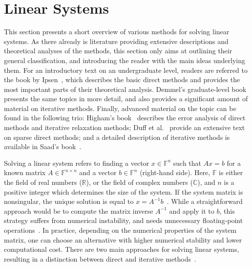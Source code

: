 \section{Linear Systems}
\label{introduction:sec:linear-systems}

This section presents a short overview of various methods for solving
linear systems. As there already is literature providing extensive
descriptions and theoretical analyses of the methods, this section only aims at
outlining their general classification, and introducing the reader with the main
ideas underlying them. For an introductory text on an undergraduate level,
readers are referred to the book by Ipsen~\cite{Ipsen2009}, which describes the
basic direct methods and provides the most important parts of their theoretical
analysis. Demmel's graduate-level book~\cite{demmel} presents the same topics in
more detail, and also provides a significant amount of material on iterative
methods. Finally, advanced material on the topic can be found in the following
trio: Higham's book~\cite{higham} describes the error analysis of direct methods
and iterative relaxation methods; Duff et al.~\cite{duff} provide an extensive
text on sparse direct methods; and a detailed description of iterative methods
is available in Saad's book~\cite{saad}.

Solving a linear system refers to finding a vector $x \in \mathbb{F}^n$ such
that $Ax = b$ for a known matrix $A \in \mathbb{F}^{n \times n}$ and a vector $b
\in \mathbb{F}^n$ (right-hand side). Here, $\mathbb{F}$ is either the field of
real numbers ($\mathbb{R}$), or the field of complex numbers ($\mathbb{C}$), and
$n$ is a positive integer which determines the size of the system. If the system
matrix is nonsingular, the unique solution is equal to $x =
A^{-1}b$~\cite{demmel}.  While a straightforward approach would be to compute
the matrix inverse $A^{-1}$ and apply it to $b$, this strategy suffers from
numerical instability, and needs unnecessary floating-point
operations~\cite{demmel,Ipsen2009}. In practice, depending on the numerical
properties of the system matrix, one can choose an alternative with higher
numerical stability and lower computational cost. There are two main approaches
for solving linear systems, resulting in a distinction between direct and
iterative methods~\cite{demmel}.

